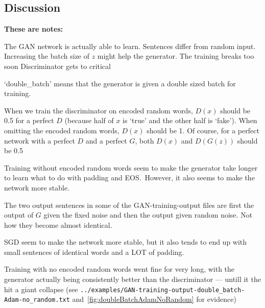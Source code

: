 \documentclass{article}
\begin{document}
\subsection{Discussion}\label{sec:discussion}

\textbf{These are notes:}

The GAN network is actually able to learn.
Sentences differ from random input.
Increasing the batch size of $z$ might help the generator.
The training breaks too soon
Discriminator gets to critical

`double\_batch' means that the generator is given a double sized batch for
training.

When we train the discriminator on encoded random words, $D(x)$ should be 0.5
for a perfect $D$ (because half of $x$ is `true' and the other half is `fake').
When omitting the encoded random words, $D(x)$ should be 1. Of course, for a
perfect network with a perfect $D$ and a perfect $G$, both $D(x)$ and $D(G(z))$
should be 0.5 

Training without encoded random words seem to make the generator take longer to
learn what to do with padding and EOS.\ However, it also seems to make the
network more stable.

The two output sentences in some of the GAN-training-output files are first the
output of $G$ given the fixed noise and then the output given random noise. Not
how they become almost identical.

SGD seem to make the network more stable, but it also tends to end up with small
sentences of identical words and a LOT of padding.

Training with no encoded random words went fine for very long, with the
generator actually being consistently better than the discriminator --- untill it
the hit a giant collapse (see
\texttt{../examples/GAN-training-output-double\_batch-Adam-no\_random.txt}
and~\ref{fig:doubleBatchAdamNoRandom} for evidence)
\end{document}
